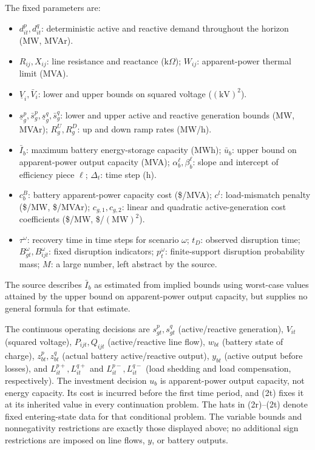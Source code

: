 \documentclass[10pt]{article}
\begin{document}
The fixed parameters are:
\begin{itemize}
\item $d_{it}^p,d_{it}^q$: deterministic active and reactive demand throughout the horizon (MW, MVAr).
\item $R_{ij},X_{ij}$: line resistance and reactance ($\mathrm{k}\Omega$); $W_{ij}$: apparent-power thermal limit (MVA).
\item $\underline V_i,\bar V_i$: lower and upper bounds on squared voltage ($(\mathrm{kV})^2$).
\item $\underline s_g^p,\bar s_g^p,\underline s_g^q,\bar s_g^q$: lower and upper active and reactive generation bounds (MW, MVAr); $R_g^U,R_g^D$: up and down ramp rates (MW/h).
\item $\bar I_b$: maximum battery energy-storage capacity (MWh); $\bar u_b$: upper bound on apparent-power output capacity (MVA); $\alpha_b^\ell,\beta_b^\ell$: slope and intercept of efficiency piece $\ell$; $\Delta_t$: time step (h).
\item $c_b^B$: battery apparent-power capacity cost (\$/MVA); $c^l$: load-mismatch penalty (\$/MW, \$/MVAr); $c_{g,1},c_{g,2}$: linear and quadratic active-generation cost coefficients (\$/MW, \$/$(\mathrm{MW})^2$).
\item $\tau^\omega$: recovery time in time steps for scenario $\omega$; $t_D$: observed disruption time; $B_{gt}^\omega,B_{ijt}^\omega$: fixed disruption indicators; $p_t^\omega$: finite-support disruption probability mass; $M$: a large number, left abstract by the source.
\end{itemize}
The source describes $\bar I_b$ as estimated from implied bounds using worst-case values attained by the upper bound on apparent-power output capacity, but supplies no general formula for that estimate.

The continuous operating decisions are $s_{gt}^p,s_{gt}^q$ (active/reactive generation), $V_{it}$ (squared voltage), $P_{ijt},Q_{ijt}$ (active/reactive line flow), $w_{bt}$ (battery state of charge), $z_{bt}^p,z_{bt}^q$ (actual battery active/reactive output), $y_{bt}$ (active output before losses), and $L_{it}^{p+},L_{it}^{q+}$ and $L_{it}^{p-},L_{it}^{q-}$ (load shedding and load compensation, respectively). The investment decision $u_b$ is apparent-power output capacity, not energy capacity. Its cost is incurred before the first time period, and (2t) fixes it at its inherited value in every continuation problem. The hats in (2r)--(2t) denote fixed entering-state data for that conditional problem. The variable bounds and nonnegativity restrictions are exactly those displayed above; no additional sign restrictions are imposed on line flows, $y$, or battery outputs.
\end{document}

